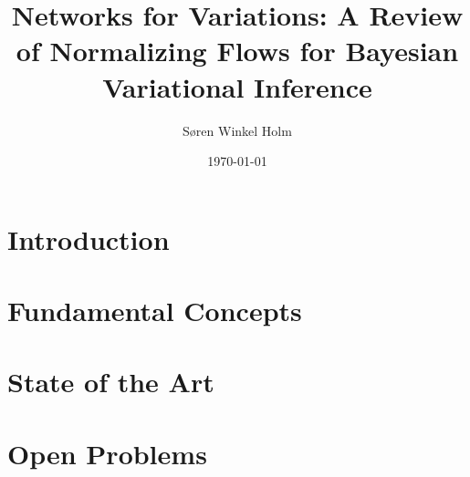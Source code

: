 \documentclass[12pt,fleqn,twocolumn]{article}
\title{Networks for Variations: A Review of Normalizing Flows for Bayesian Variational Inference}
\author{Søren Winkel Holm}
\date{\today}
\begin{document}
\setlength{\headheight}{15pt}
\addtolength{\topmargin}{-2.5pt}

\maketitle
\thispagestyle{fancy}

\section*{Introduction}%
\label{sec:Introduction}


\section*{Fundamental Concepts}%

\section*{State of the Art}%
\section*{Open Problems}%
\label{sec:Open Problems}

\clearpage
\renewcommand*{\bibfont}{\normalfont\footnotesize}
\printbibliography[heading=bibintoc]

\printglossary[type=\acronymtype]
\end{document}
